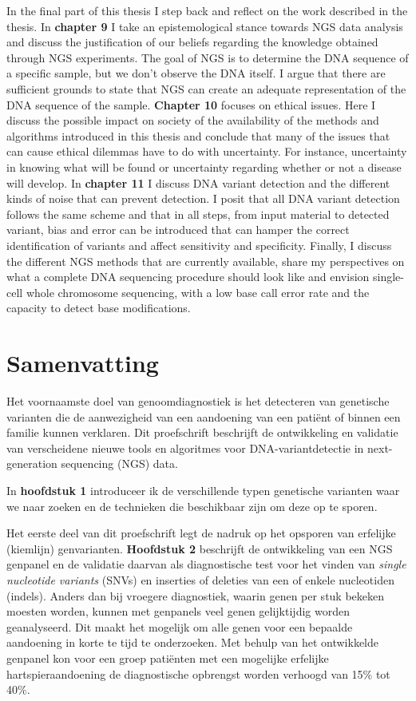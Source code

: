 \begin{appendices}
	In the final part of this thesis I step back and reflect on the work described in the thesis. In \textbf{chapter 9} I take an epistemological stance towards NGS data analysis and discuss the justification of our beliefs regarding the knowledge obtained through NGS experiments. The goal of NGS is to determine the DNA sequence of a specific sample, but we don’t observe the DNA itself. I argue that there are sufficient grounds to state that NGS can create an adequate representation of the DNA sequence of the sample. \textbf{Chapter 10} focuses on ethical issues. Here I discuss the possible impact on society of the availability of the methods and algorithms introduced in this thesis and conclude that many of the issues that can cause ethical dilemmas have to do with uncertainty. For instance, uncertainty in knowing what will be found or uncertainty regarding whether or not a disease will develop. In \textbf{chapter 11} I discuss DNA variant detection and the different kinds of noise that can prevent detection. I posit that all DNA variant detection follows the same scheme and that in all steps, from input material to detected variant, bias and error can be introduced that can hamper the correct identification of variants and affect sensitivity and specificity. Finally, I discuss the different NGS methods that are currently available, share my perspectives on what a complete DNA sequencing procedure should look like and envision single-cell whole chromosome sequencing, with a low base call error rate and the capacity to detect base modifications.
	

	
	\chapter{Samenvatting}
	Het voornaamste doel van genoomdiagnostiek is het detecteren van genetische varianten die de aanwezigheid van een aandoening van een patiënt of binnen een familie kunnen verklaren. Dit proefschrift beschrijft de ontwikkeling en validatie van verscheidene nieuwe tools en algoritmes voor DNA-variantdetectie in next-generation sequencing (NGS) data.
	
	In \textbf{hoofdstuk 1} introduceer ik de verschillende typen genetische varianten waar we naar zoeken en de technieken die beschikbaar zijn om deze op te sporen.
	
	Het eerste deel van dit proefschrift legt de nadruk op het opsporen van erfelijke (kiemlijn) genvarianten. \textbf{Hoofdstuk 2} beschrijft de ontwikkeling van een NGS genpanel en de validatie daarvan als diagnostische test voor het vinden van \textsl{single nucleotide variants} (SNVs) en inserties of deleties van een of enkele nucleotiden (indels). Anders dan bij vroegere diagnostiek, waarin genen per stuk bekeken moesten worden, kunnen met genpanels veel genen gelijktijdig worden geanalyseerd. Dit maakt het mogelijk om alle genen voor een bepaalde aandoening in korte te tijd te onderzoeken. Met behulp van het ontwikkelde genpanel kon voor een groep patiënten met een mogelijke erfelijke hartspieraandoening de diagnostische opbrengst worden verhoogd van 15\% tot 40\%. 
	

\end{appendices}
